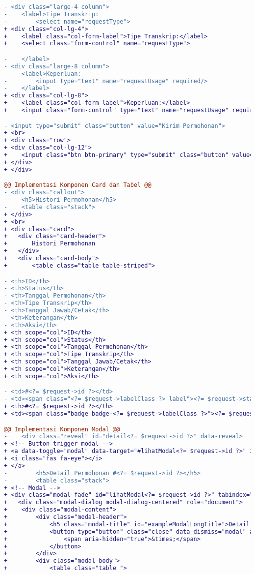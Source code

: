 \begin{lstlisting}[language=diff, caption=Perubahan file \path{\views\TranskripRequest\main.php}, label=Entri, basicstyle=\ttfamily, frame=single,
columns=fullflexible, keepspaces=true, breaklines=true]
- <div class="large-4 column">
-    <label>Tipe Transkrip:
-        <select name="requestType">
+ <div class="col-lg-4">
+    <label class="col-form-label">Tipe Transkrip:</label>
+    <select class="form-control" name="requestType">

-    </label>
- <div class="large-8 column">
-    <label>Keperluan:
-        <input type="text" name="requestUsage" required/>
-    </label>
+ <div class="col-lg-8">
+    <label class="col-form-label">Keperluan:</label>
+    <input class="form-control" type="text" name="requestUsage" required/>

- <input type="submit" class="button" value="Kirim Permohonan">
+ <br>
+ <div class="row">
+ <div class="col-lg-12">
+    <input class="btn btn-primary" type="submit" class="button" value="Kirim Permohonan">
+ </div>
+ </div>

@@ Implementasi Komponen Card dan Tabel @@
- <div class="callout">
-    <h5>Histori Permohonan</h5>
-    <table class="stack">
+ </div>
+ <br>
+ <div class="card">
+ 	<div class="card-header">
+    	Histori Permohonan
+ 	</div>
+ 	<div class="card-body">
+    	<table class="table table-striped">

- <th>ID</th>
- <th>Status</th>
- <th>Tanggal Permohonan</th>
- <th>Tipe Transkrip</th>
- <th>Tanggal Jawab/Cetak</th>
- <th>Keterangan</th>
- <th>Aksi</th>
+ <th scope="col">ID</th>
+ <th scope="col">Status</th>
+ <th scope="col">Tanggal Permohonan</th>
+ <th scope="col">Tipe Transkrip</th>
+ <th scope="col">Tanggal Jawab/Cetak</th>
+ <th scope="col">Keterangan</th>
+ <th scope="col">Aksi</th>

- <td>#<?= $request->id ?></td>
- <td><span class="<?= $request->labelClass ?> label"><?= $request->status ?></span></td>
+ <th>#<?= $request->id ?></th>
+ <td><span class="badge badge-<?= $request->labelClass ?>"><?= $request->status ?></span></td>

@@ Implementasi Komponen Modal @@
-    <div class="reveal" id="detail<?= $request->id ?>" data-reveal>
+ <!-- Button trigger modal -->
+ <a data-toggle="modal" data-target="#lihatModal<?= $request->id ?>" id="detail<?= $request->id ?>">
+ <i class="fas fa-eye"></i>
+ </a>
-        <h5>Detail Permohonan #<?= $request->id ?></h5>
-        <table class="stack">
+ <!-- Modal -->
+ <div class="modal fade" id="lihatModal<?= $request->id ?>" tabindex="-1" role="dialog" aria-labelledby="exampleModalCenterTitle" aria-hidden="true">
+ 	<div class="modal-dialog modal-dialog-centered" role="document">
+    <div class="modal-content">
+        <div class="modal-header">
+            <h5 class="modal-title" id="exampleModalLongTitle">Detail Permohonan #<?= $request->id ?></h5>
+            <button type="button" class="close" data-dismiss="modal" aria-label="Close">
+                <span aria-hidden="true">&times;</span>
+            </button>
+        </div>
+        <div class="modal-body">
+            <table class="table ">


\end{lstlisting}
